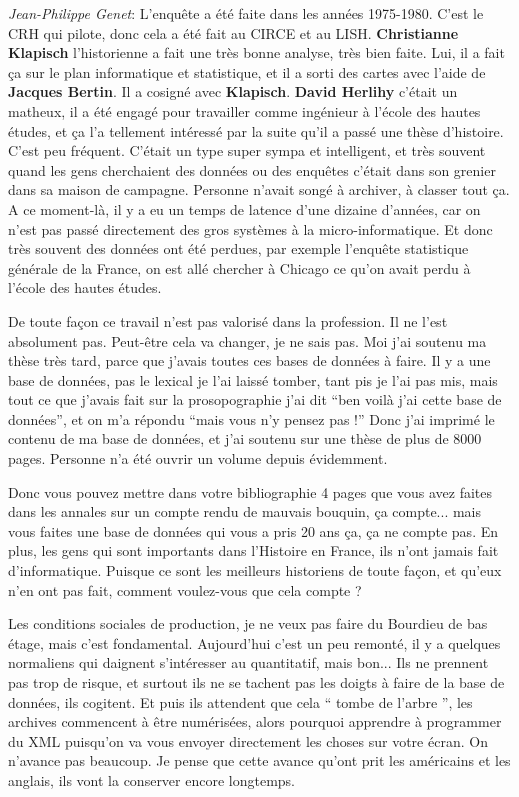 \noindent\emph{Jean-Philippe Genet}: L’enquête a été faite dans les années 1975-1980. C'est le CRH qui pilote, donc cela a été fait au CIRCE et au LISH. \textbf{Christianne Klapisch} l'historienne a fait une très bonne analyse, très bien faite. Lui, il a fait ça sur le plan informatique et statistique, et il a sorti des cartes avec l'aide de \textbf{Jacques Bertin}. Il a cosigné avec \textbf{Klapisch}. \textbf{David Herlihy} c'était un matheux, il a été engagé pour travailler comme ingénieur à l'école des hautes études, et ça l'a tellement intéressé par la suite qu'il a passé une thèse d'histoire. C'est peu fréquent. C'était un type super sympa et intelligent, et très souvent quand les gens cherchaient des données ou des enquêtes c'était dans son grenier dans sa maison de campagne. Personne n'avait songé à archiver, à classer tout ça. A ce moment-là, il y a eu un temps de latence d'une dizaine d'années, car on n'est pas passé directement des gros systèmes à la micro-informatique. Et donc très souvent des données ont été perdues, par exemple l'enquête statistique générale de la France, on est allé chercher à Chicago ce qu'on avait perdu à l'école des hautes études. 

De toute façon ce travail n’est pas valorisé dans la profession. Il ne l'est absolument pas. Peut-être cela va changer, je ne sais pas. Moi j'ai soutenu ma thèse très tard, parce que j'avais toutes ces bases de données à faire. Il y a une base de données, pas le lexical je l'ai laissé tomber, tant pis je l'ai pas mis, mais tout ce que j'avais fait sur la prosopographie j'ai dit \enquote{ben voilà j'ai cette base de données}, et on m'a répondu \enquote{mais vous n'y pensez pas !} Donc j'ai imprimé le contenu de ma base de données, et j'ai soutenu sur une thèse de plus de 8000 pages. Personne n'a été ouvrir un volume depuis évidemment. 

Donc vous pouvez mettre dans votre bibliographie 4 pages que vous avez faites dans les annales sur un compte rendu de mauvais bouquin, ça compte... mais vous faites une base de données qui vous a pris 20 ans ça, ça ne compte pas. En plus, les gens qui sont importants dans l'Histoire en France, ils n'ont jamais fait d'informatique. Puisque ce sont les meilleurs historiens de toute façon, et qu’eux n'en ont pas fait, comment voulez-vous que cela compte ? 

Les conditions sociales de production, je ne veux pas faire du Bourdieu de bas étage, mais c'est fondamental. Aujourd'hui c'est un peu remonté, il y a quelques normaliens qui daignent s'intéresser au quantitatif, mais bon... Ils ne prennent pas trop de risque, et surtout ils ne se tachent pas les doigts à faire de la base de données, ils cogitent. Et puis ils attendent que cela \enquote{ tombe de l'arbre }, les archives commencent à être numérisées, alors pourquoi apprendre à programmer du XML puisqu'on va vous envoyer directement les choses sur votre écran. On n’avance pas beaucoup. Je pense que cette avance qu'ont prit les américains et les anglais, ils vont la conserver encore longtemps.


